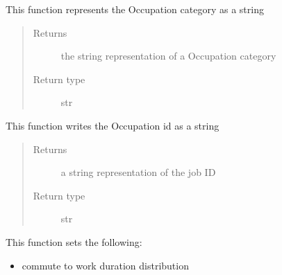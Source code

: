 \documentclass[letterpaper,10pt,english]{sphinxmanual}
\begin{document}
\begin{fulllineitems}
\begin{fulllineitems}
\begin{quote}
\begin{description}
\end{description}\end{quote}

\end{fulllineitems}


\begin{fulllineitems}
\label{occupation:occupation.Occupation.print_category}
This function represents the Occupation category as a string
\begin{quote}\begin{description}
\item[{Returns}] \leavevmode
the string representation of a Occupation category

\item[{Return type}] \leavevmode
str

\end{description}\end{quote}

\end{fulllineitems}


\begin{fulllineitems}
\label{occupation:occupation.Occupation.print_id}
This function writes the Occupation id as a string
\begin{quote}\begin{description}
\item[{Returns}] \leavevmode
a string representation of the job ID

\item[{Return type}] \leavevmode
str

\end{description}\end{quote}

\end{fulllineitems}


\begin{fulllineitems}
\label{occupation:occupation.Occupation.set_commute_distribution}
This function sets the following:
\begin{itemize}
\item {} 
commute to work duration distribution


\end{itemize}
\end{fulllineitems}
\end{fulllineitems}
\end{document}
